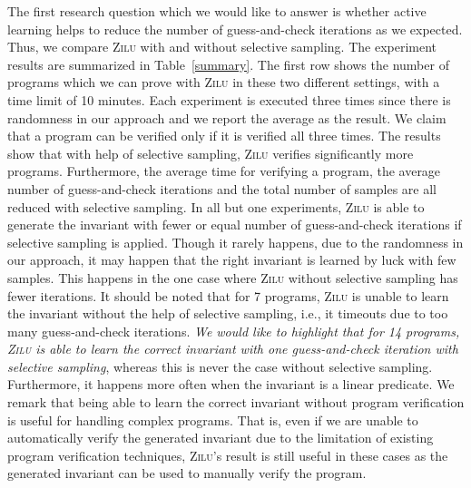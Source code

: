 The first research question which we would like to answer is whether active learning helps to reduce the number of guess-and-check iterations as we expected. Thus, we compare \textsc{Zilu} with and without selective sampling. The experiment results are summarized in Table~\ref{summary}. The first row shows the number of programs which we can prove with \textsc{Zilu} in these two different settings, with a time limit of 10 minutes. Each experiment is executed three times since there is randomness in our approach and we report the average as the result. We claim that a program can be verified only if it is verified all three times. The results show that with help of selective sampling, \textsc{Zilu} verifies significantly more programs. Furthermore, the average time for verifying a program, the average number of guess-and-check iterations and the total number of samples are all reduced with selective sampling. In all but one experiments, \textsc{Zilu} is able to generate the invariant with fewer or equal number of guess-and-check iterations if selective sampling is applied. Though it rarely happens, due to the randomness in our approach, it may happen that the right invariant is learned by luck with few samples. This happens in the one case where \textsc{Zilu} without selective sampling has fewer iterations. It should be noted that for 7 programs, \textsc{Zilu} is unable to learn the invariant without the help of selective sampling, i.e., it timeouts due to too many guess-and-check iterations. \emph{We would like to highlight that for 14 programs, \textsc{Zilu} is able to learn the correct invariant with one guess-and-check iteration with selective sampling}, whereas this is never the case without selective sampling. Furthermore, it happens more often when the invariant is a linear predicate. We remark that being able to learn the correct invariant without program verification is useful for handling complex programs. That is, even if we are unable to automatically verify the generated invariant due to the limitation of existing program verification techniques, \textsc{Zilu}'s result is still useful in these cases as the generated invariant can be used to manually verify the program.

